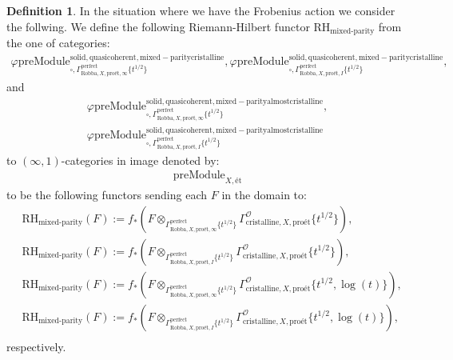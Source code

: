 \documentclass[12pt]{book}
\theoremstyle{definition}
\newtheorem{definition}{Definition}
\begin{document}
\begin{definition}
In the situation where we have the Frobenius action we consider the follwing. We define the following Riemann-Hilbert functor $\text{RH}_\text{mixed-parity}$ from the one of categories:
\begin{align}
\varphi\mathrm{preModule}^\mathrm{solid,quasicoherent,mixed-paritycristalline}_{\square,\Gamma^\mathrm{perfect}_{\text{Robba},X,\text{pro\'et},\infty}\{t^{1/2}\}},
\varphi\mathrm{preModule}^\mathrm{solid,quasicoherent,mixed-paritycristalline}_{\square,\Gamma^\mathrm{perfect}_{\text{Robba},X,\text{pro\'et},I}\{t^{1/2}\}}, 
\end{align}
and
\begin{align}
\varphi\mathrm{preModule}^\mathrm{solid,quasicoherent,mixed-parityalmostcristalline}_{\square,\Gamma^\mathrm{perfect}_{\text{Robba},X,\text{pro\'et},\infty}\{t^{1/2}\}},\\
\varphi\mathrm{preModule}^\mathrm{solid,quasicoherent,mixed-parityalmostcristalline}_{\square,\Gamma^\mathrm{perfect}_{\text{Robba},X,\text{pro\'et},I}\{t^{1/2}\}} 
\end{align}
to $(\infty,1)$-categories in image denoted by:
\begin{align}
\mathrm{preModule}_{X,\text{\'et}}
\end{align}
to be the following functors sending each $F$ in the domain to:
\begin{align}
&\text{RH}_\text{mixed-parity}(F):=f_*(F\otimes_{\Gamma^\mathrm{perfect}_{\text{Robba},X,\text{pro\'et},\infty}\{t^{1/2}\}} \Gamma^\mathcal{O}_{\text{cristalline},X,\text{pro\'et}}\{t^{1/2}\}),\\
&\text{RH}_\text{mixed-parity}(F):=f_*(F\otimes_{\Gamma^\mathrm{perfect}_{\text{Robba},X,\text{pro\'et},I}\{t^{1/2}\}} \Gamma^\mathcal{O}_{\text{cristalline},X,\text{pro\'et}}\{t^{1/2}\}),\\
&\text{RH}_\text{mixed-parity}(F):=f_*(F\otimes_{\Gamma^\mathrm{perfect}_{\text{Robba},X,\text{pro\'et},\infty}\{t^{1/2}\}} \Gamma^\mathcal{O}_{\text{cristalline},X,\text{pro\'et}}\{t^{1/2},\log(t)\}),\\
&\text{RH}_\text{mixed-parity}(F):=f_*(F\otimes_{\Gamma^\mathrm{perfect}_{\text{Robba},X,\text{pro\'et},I}\{t^{1/2}\}} \Gamma^\mathcal{O}_{\text{cristalline},X,\text{pro\'et}}\{t^{1/2},\log(t)\}),\\
\end{align}
respectively.

\end{definition}
\end{document}
